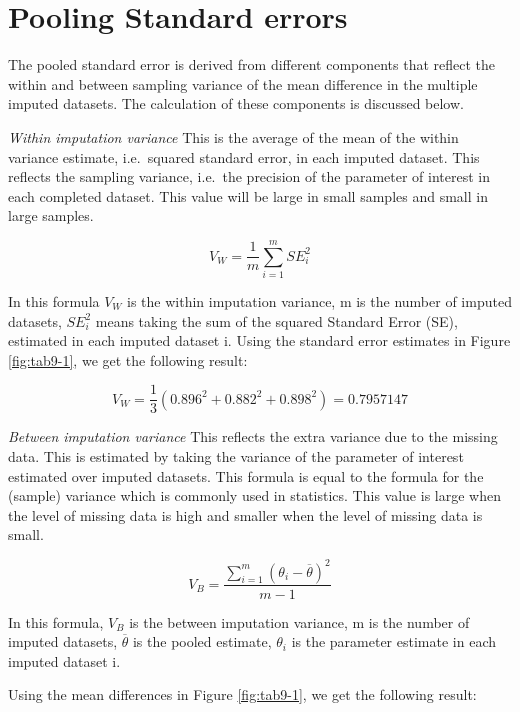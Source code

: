 \documentclass[
]{book}
\begin{document}
\hypertarget{pooling-standard-errors}{%
\section{Pooling Standard errors}\label{pooling-standard-errors}}

The pooled standard error is derived from different components that reflect the within and between sampling variance of the mean difference in the multiple imputed datasets. The calculation of these components is discussed below.

\emph{Within imputation variance}
This is the average of the mean of the within variance estimate, i.e.~squared standard error, in each imputed dataset. This reflects the sampling variance, i.e.~the precision of the parameter of interest in each completed dataset. This value will be large in small samples and small in large samples.

\begin{equation}
V_W = \frac{1}{m} \sum_{i=1}^m{SE_i^2}
  \label{eq:var-w}
\end{equation}

In this formula \(V_W\) is the within imputation variance, m is the number of imputed datasets, \(SE_i^2\) means taking the sum of the squared Standard Error (SE), estimated in each imputed dataset i. Using the standard error estimates in Figure \ref{fig:tab9-1}, we get the following result:

\[V_W = \frac{1}{3}(0.896^2 + 0.882^2 + 0.898^2)=0.7957147\]

\emph{Between imputation variance}
This reflects the extra variance due to the missing data. This is estimated by taking the variance of the parameter of interest estimated over imputed datasets. This formula is equal to the formula for the (sample) variance which is commonly used in statistics. This value is large when the level of missing data is high and smaller when the level of missing data is small.

\begin{equation}
V_B = \frac{\sum_{i=1}^m (\theta_i - \overline{\theta})^2}{m-1} 
  \label{eq:var-b}
\end{equation}

In this formula, \(V_B\) is the between imputation variance, m is the number of imputed datasets, \(\overline{\theta}\) is the pooled estimate, \(\theta_i\) is the parameter estimate in each imputed dataset i.

Using the mean differences in Figure \ref{fig:tab9-1}, we get the following result:
\end{document}
